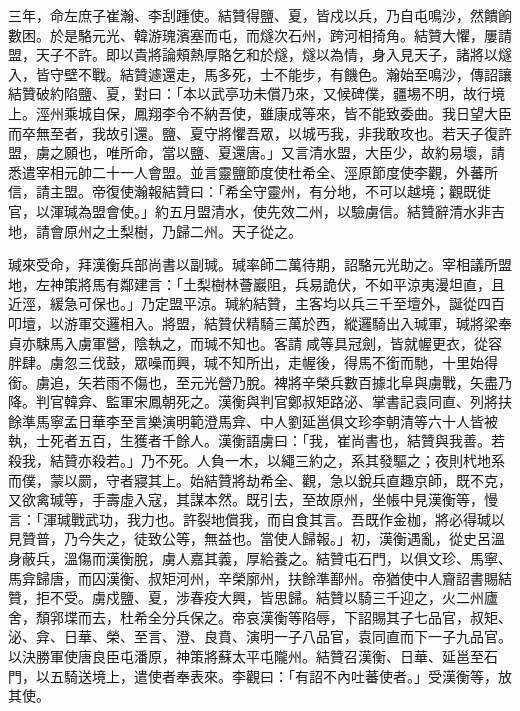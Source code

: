 \begin{pinyinscope}
 三年，命左庶子崔瀚、李刮踵使。結贊得鹽、夏，皆戍以兵，乃自屯鳴沙，然饋餉數困。於是駱元光、韓游瑰濱塞而屯，而燧次石州，跨河相掎角。結贊大懼，屢請盟，天子不許。即以貴將論頰熱厚賂乞和於燧，燧以為情，身入見天子，諸將以燧入，皆守壁不戰。結贊遽還走，馬多死，士不能步，有饑色。瀚始至鳴沙，傳詔讓結贊破約陷鹽、夏，對曰：「本以武亭功未償乃來，又候碑僕，疆埸不明，故行境上。涇州乘城自保，鳳翔李令不納吾使，雖康成等來，皆不能致委曲。我日望大臣而卒無至者，我故引還。鹽、夏守將懼吾眾，以城丐我，非我敢攻也。若天子復許盟，虜之願也，唯所命，當以鹽、夏還唐。」又言清水盟，大臣少，故約易壞，請悉遣宰相元帥二十一人會盟。並言靈鹽節度使杜希全、涇原節度使李觀，外蕃所信，請主盟。帝復使瀚報結贊曰：「希全守靈州，有分地，不可以越境；觀既徙官，以渾瑊為盟會使。」約五月盟清水，使先效二州，以驗虜信。結贊辭清水非吉地，請會原州之土梨樹，乃歸二州。天子從之。



 瑊來受命，拜漢衡兵部尚書以副瑊。瑊率師二萬待期，詔駱元光助之。宰相議所盟地，左神策將馬有鄰建言：「土梨樹林薈巖阻，兵易詭伏，不如平涼夷漫坦直，且近涇，緩急可保也。」乃定盟平涼。瑊約結贊，主客均以兵三千至壇外，誕從四百叩壇，以游軍交邏相入。將盟，結贊伏精騎三萬於西，縱邏騎出入瑊軍，瑊將梁奉貞亦駷馬入虜軍營，陰執之，而瑊不知也。客請咸等具冠劍，皆就幄更衣，從容胖肆。虜忽三伐鼓，眾噪而興，瑊不知所出，走幄後，得馬不銜而馳，十里始得銜。虜追，矢若雨不傷也，至元光營乃脫。裨將辛榮兵數百據北阜與虜戰，矢盡乃降。判官韓弇、監軍宋鳳朝死之。漢衡與判官鄭叔矩路泌、掌書記袁同直、列將扶餘準馬寧孟日華李至言樂演明範澄馬弇、中人劉延邕俱文珍李朝清等六十人皆被執，士死者五百，生獲者千餘人。漢衡語虜曰：「我，崔尚書也，結贊與我善。若殺我，結贊亦殺若。」乃不死。人負一木，以繩三約之，系其發驅之；夜則杙地系而僕，蒙以罽，守者寢其上。始結贊將劫希全、觀，急以銳兵直趣京師，既不克，又欲禽瑊等，手壽虛入寇，其謀本然。既引去，至故原州，坐帳中見漢衡等，慢言：「渾瑊戰武功，我力也。許裂地償我，而自食其言。吾既作金枷，將必得瑊以見贊普，乃今失之，徒致公等，無益也。當使人歸報。」初，漢衡遇亂，從史呂溫身蔽兵，溫傷而漢衡脫，虜人嘉其義，厚給養之。結贊屯石門，以俱文珍、馬寧、馬弇歸唐，而囚漢衡、叔矩河州，辛榮廓州，扶餘準鄯州。帝猶使中人齎詔書賜結贊，拒不受。虜戍鹽、夏，涉春疫大興，皆思歸。結贊以騎三千迎之，火二州廬舍，頹郛堞而去，杜希全分兵保之。帝哀漢衡等陷辱，下詔賜其子七品官，叔矩、泌、弇、日華、榮、至言、澄、良賁、演明一子八品官，袁同直而下一子九品官。以決勝軍使唐良臣屯潘原，神策將蘇太平屯隴州。結贊召漢衡、日華、延邕至石門，以五騎送境上，遣使者奉表來。李觀曰：「有詔不內吐蕃使者。」受漢衡等，放其使。




\end{pinyinscope}
